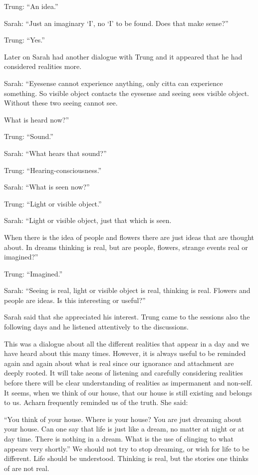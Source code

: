 Trung: ``An idea.''

Sarah: ``Just an imaginary `I', no `I' to be found. Does that make
sense?''

Trung: ``Yes.''

Later on Sarah had another dialogue with Trung and it appeared that he
had considered realities more.

Sarah: ``Eyesense cannot experience anything, only citta can experience
something. So visible object contacts the eyesense and seeing sees
visible object. Without these two seeing cannot see.

What is heard now?''

Trung: ``Sound.''

Sarah: ``What hears that sound?''

Trung: ``Hearing-consciousness.''

Sarah: ``What is seen now?''

Trung: ``Light or visible object.''

Sarah: ``Light or visible object, just that which is seen.

When there is the idea of people and flowers there are just ideas that
are thought about. In dreams thinking is real, but are people, flowers,
strange events real or imagined?''

Trung: ``Imagined.''

Sarah: ``Seeing is real, light or visible object is real, thinking is
real. Flowers and people are ideas. Is this interesting or useful?''

Sarah said that she appreciated his interest. Trung came to the sessions
also the following days and he listened attentively to the discussions.

This was a dialogue about all the different realities that appear in a
day and we have heard about this many times. However, it is always
useful to be reminded again and again about what is real since our
ignorance and attachment are deeply rooted. It will take aeons of
listening and carefully considering realities before there will be clear
understanding of realities as impermanent and non-self. It seems, when
we think of our house, that our house is still existing and belongs to
us. Acharn frequently reminded us of the truth. She said:

``You think of your house. Where is your house? You are just dreaming
about your house. Can one say that life is just like a dream, no matter
at night or at day time. There is nothing in a dream. What is the use of
clinging to what appears very shortly.'' We should not try to stop
dreaming, or wish for life to be different. Life should be understood.
Thinking is real, but the stories one thinks of are not real.

